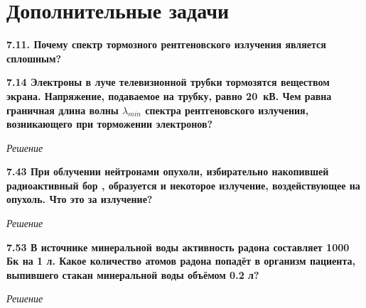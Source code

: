 \documentclass[a4paper, fontsize=14pt]{extreport}
\newcounter{Solving}
\begin{document}
\section{Дополнительные задачи}



\textbf{7.11. Почему спектр тормозного рентгеновского излучения является сплошным?}


\textbf{7.14 Электроны в луче телевизионной трубки тормозятся веществом экрана. Напряжение, подаваемое на трубку, равно 20~кВ. Чем равна граничная длина волны $\lambda_{min}$ спектра рентгеновского излучения, возникающего при торможении электронов?}

\textit{Решение \\
%
}

\textbf{7.43 При облучении нейтронами опухоли, избирательно накопившей радиоактивный бор  , образуется  и некоторое излучение, воздействующее на опухоль. Что это за излучение?}

\textit{Решение \\
%
}

\textbf{7.53 В источнике минеральной воды активность радона составляет 1000 Бк на 1 л. Какое количество атомов радона попадёт в организм пациента, выпившего стакан минеральной воды объёмом 0.2 л? }

\textit{Решение \\
%
}
\end{document}
